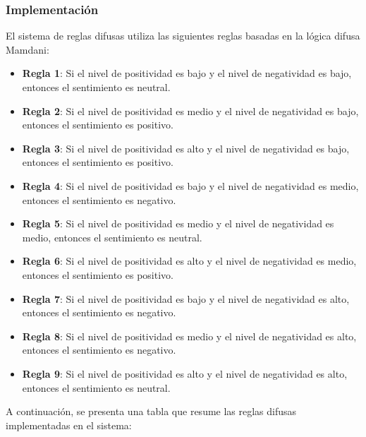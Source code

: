 \documentclass[sigconf, review=false, nonacm]{acmart}
\begin{document}
\subsubsection{Implementación}
El sistema de reglas difusas utiliza las siguientes reglas basadas en la lógica difusa Mamdani:
\begin{itemize}
	\item \textbf{Regla 1}: Si el nivel de positividad es bajo y el nivel de negatividad es bajo, entonces el sentimiento es neutral.
	\item \textbf{Regla 2}: Si el nivel de positividad es medio y el nivel de negatividad es bajo, entonces el sentimiento es positivo.
	\item \textbf{Regla 3}: Si el nivel de positividad es alto y el nivel de negatividad es bajo, entonces el sentimiento es positivo.
	\item \textbf{Regla 4}: Si el nivel de positividad es bajo y el nivel de negatividad es medio, entonces el sentimiento es negativo.
	\item \textbf{Regla 5}: Si el nivel de positividad es medio y el nivel de negatividad es medio, entonces el sentimiento es neutral.
	\item \textbf{Regla 6}: Si el nivel de positividad es alto y el nivel de negatividad es medio, entonces el sentimiento es positivo.
	\item \textbf{Regla 7}: Si el nivel de positividad es bajo y el nivel de negatividad es alto, entonces el sentimiento es negativo.
	\item \textbf{Regla 8}: Si el nivel de positividad es medio y el nivel de negatividad es alto, entonces el sentimiento es negativo.
	\item \textbf{Regla 9}: Si el nivel de positividad es alto y el nivel de negatividad es alto, entonces el sentimiento es neutral.
\end{itemize}

A continuación, se presenta una tabla que resume las reglas difusas implementadas en el sistema:
\end{document}
